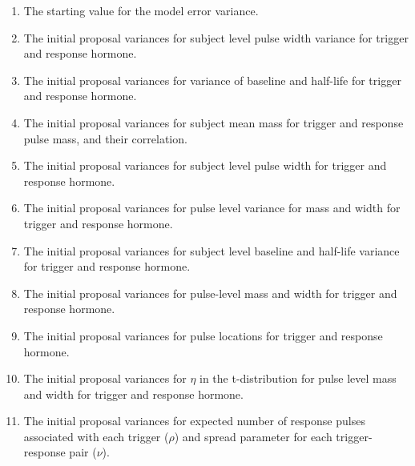 \documentclass[12pt, oneside]{article}   	%
\begin{document}
\begin{enumerate}
\item The starting value for the model error variance.
\item The initial proposal variances for subject level pulse width variance for trigger and response hormone.
\item The initial proposal variances for variance of baseline and half-life for trigger and response hormone.
\item The initial proposal variances for  subject mean mass for trigger and response pulse mass, and their correlation.
\item The initial proposal variances for subject level pulse width for trigger and response hormone.
\item The initial proposal variances for pulse level variance for  mass and width for trigger and response hormone.
\item The initial proposal variances for subject level baseline and half-life variance for trigger and response hormone.
\item The initial proposal variances for pulse-level mass and width for trigger and response hormone.
\item The initial proposal variances for pulse locations for trigger and response hormone.
\item The initial proposal variances for $\eta$ in the t-distribution for pulse level mass and width for trigger and response hormone.
\item The initial proposal variances for expected number of response pulses associated with each trigger ($\rho$) and spread parameter for each trigger-response pair ($\nu$).


\end{enumerate}
\end{document}
